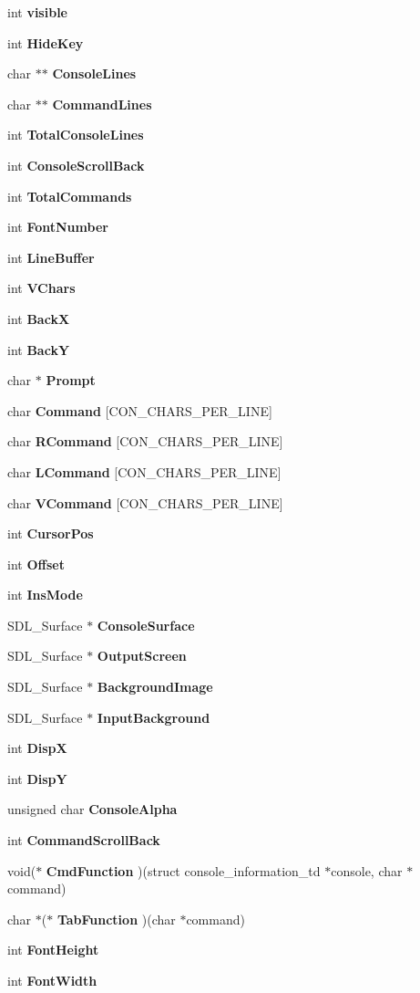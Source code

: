 \begin{CompactItemize}
\item 
int {\bf visible}
\item 
int {\bf Hide\-Key}
\item 
char $\ast$$\ast$ {\bf Console\-Lines}
\item 
char $\ast$$\ast$ {\bf Command\-Lines}
\item 
int {\bf Total\-Console\-Lines}
\item 
int {\bf Console\-Scroll\-Back}
\item 
int {\bf Total\-Commands}
\item 
int {\bf Font\-Number}
\item 
int {\bf Line\-Buffer}
\item 
int {\bf VChars}
\item 
int {\bf Back\-X}
\item 
int {\bf Back\-Y}
\item 
char $\ast$ {\bf Prompt}
\item 
char {\bf Command} [CON\_\-CHARS\_\-PER\_\-LINE]
\item 
char {\bf RCommand} [CON\_\-CHARS\_\-PER\_\-LINE]
\item 
char {\bf LCommand} [CON\_\-CHARS\_\-PER\_\-LINE]
\item 
char {\bf VCommand} [CON\_\-CHARS\_\-PER\_\-LINE]
\item 
int {\bf Cursor\-Pos}
\item 
int {\bf Offset}
\item 
int {\bf Ins\-Mode}
\item 
SDL\_\-Surface $\ast$ {\bf Console\-Surface}
\item 
SDL\_\-Surface $\ast$ {\bf Output\-Screen}
\item 
SDL\_\-Surface $\ast$ {\bf Background\-Image}
\item 
SDL\_\-Surface $\ast$ {\bf Input\-Background}
\item 
int {\bf Disp\-X}
\item 
int {\bf Disp\-Y}
\item 
unsigned char {\bf Console\-Alpha}
\item 
int {\bf Command\-Scroll\-Back}
\item 
void($\ast$ {\bf Cmd\-Function} )(struct console\_\-information\_\-td $\ast$console, char $\ast$command)
\item 
char $\ast$($\ast$ {\bf Tab\-Function} )(char $\ast$command)
\item 
int {\bf Font\-Height}
\item 
int {\bf Font\-Width}
\end{CompactItemize}


